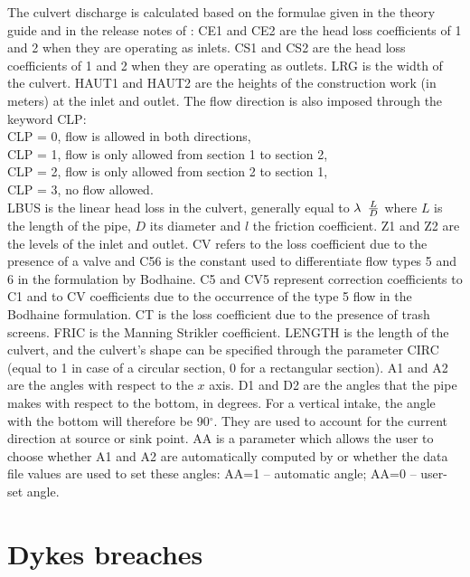 The culvert discharge is calculated based on the formulae given
in the  theory guide and in the release notes of :
CE1 and CE2 are the head loss coefficients of 1 and 2 when they are operating as
inlets.
CS1 and CS2 are the head loss coefficients of 1 and 2 when they are operating as
outlets.
LRG is the width of the culvert.
HAUT1 and HAUT2 are the heights of the construction work (in meters)
at the inlet and outlet.
The flow direction is also imposed through the keyword CLP:\\
CLP = 0, flow is allowed in both directions,\\
CLP = 1, flow is only allowed from section 1 to section 2,\\
CLP = 2, flow is only allowed from section 2 to section 1,\\
CLP = 3, no flow allowed.\\
LBUS is the linear head loss in the culvert, generally equal to
$\lambda {\kern 1pt} {\kern 1pt} {\kern 1pt} {\kern 1pt} {\kern 1pt} \frac{L}{D} $
where $L$ is the length of the pipe, $D$ its diameter and $l$ the friction
coefficient.
Z1 and Z2 are the levels of the inlet and outlet.
CV refers to the loss coefficient due to the presence of a valve and
C56 is the constant used to differentiate flow types 5 and 6 in the formulation
by Bodhaine.
C5 and CV5 represent correction coefficients to C1 and to CV coefficients
due to the occurrence of the type 5 flow in the Bodhaine formulation.
CT is the loss coefficient due to the presence of trash screens.
FRIC is the Manning Strikler coefficient.
LENGTH is the length of the culvert, and the culvert's shape can be specified
through the parameter CIRC (equal to 1 in
case of a circular section, 0 for a rectangular section).
A1 and A2 are the angles with respect to the $x$ axis.
D1 and D2 are the angles that the pipe makes with respect to the bottom,
in degrees.
For a vertical intake, the angle with the bottom will therefore be 90$^\circ$.
They are used to account for the current direction at source or sink point.
AA is a parameter which allows the user to choose whether A1 and A2 are
automatically computed by 
or whether the data file values are used to set these angles:
AA=1 -- automatic angle; AA=0 -- user-set angle.


\section{Dykes breaches}
\label{sec:dykes}
